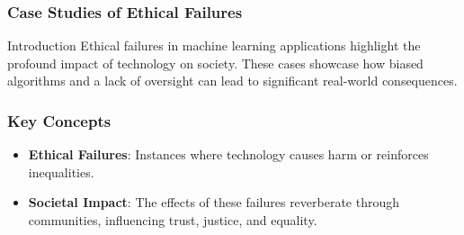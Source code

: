 \documentclass[aspectratio=169]{beamer}
\begin{document}
\begin{frame}[fragile]
    \frametitle{Case Studies of Ethical Failures}
    \begin{block}{Introduction}
        Ethical failures in machine learning applications highlight the profound impact of technology on society. These cases showcase how biased algorithms and a lack of oversight can lead to significant real-world consequences.
    \end{block}
\end{frame}

\begin{frame}[fragile]
    \frametitle{Key Concepts}
    \begin{itemize}
        \item \textbf{Ethical Failures}: Instances where technology causes harm or reinforces inequalities.
        \item \textbf{Societal Impact}: The effects of these failures reverberate through communities, influencing trust, justice, and equality.
    \end{itemize}
\end{frame}
\end{document}
